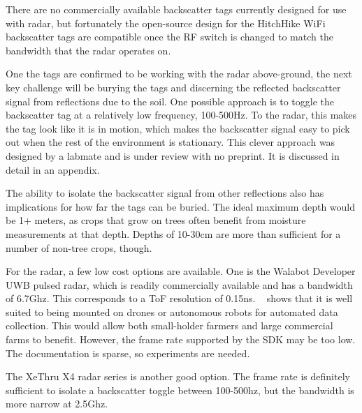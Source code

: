 \documentclass[12pt]{article}
\begin{document}

There are no commercially available backscatter tags currently
designed for use with radar, but fortunately the open-source design
for the HitchHike WiFi backscatter tags are compatible once the RF
switch is changed to match the bandwidth that the radar operates on.

One the tags are confirmed to be working with the radar above-ground,
the next key challenge will be burying the tags and discerning the
reflected backscatter signal from reflections due to the soil. One
possible approach is to toggle the backscatter tag at a relatively low
frequency, 100-500Hz. To the radar, this makes the tag look like it is
in motion, which makes the backscatter signal easy to pick out when
the rest of the environment is stationary. This clever approach was
designed by a labmate and is under review with no preprint. It is discussed in detail in an appendix.

The ability to isolate the backscatter signal from other reflections
also has implications for how far the tags can be buried. The ideal
maximum depth would be 1+ meters, as crops that grow on trees often
benefit from moisture measurements at that depth. Depths of 10-30cm
are more than sufficient for a number of non-tree crops, though.

For the radar, a few low cost options are available. One is the
Walabot Developer UWB pulsed radar, which is readily commercially
available and has a bandwidth of 6.7Ghz. This corresponds to a ToF
resolution of 0.15ns. ~\cite{uwbThesis} shows that it is well suited
to being mounted on drones or autonomous robots for automated data
collection. This would allow both small-holder farmers and large
commercial farms to benefit. However, the frame rate supported by the
SDK may be too low. The documentation is sparse, so experiments are
needed.

The XeThru X4 radar series is another good option. The frame rate is
definitely sufficient to isolate a backscatter toggle between
100-500hz, but the bandwidth is more narrow at 2.5Ghz. 

\subsection*{}
\end{document}
